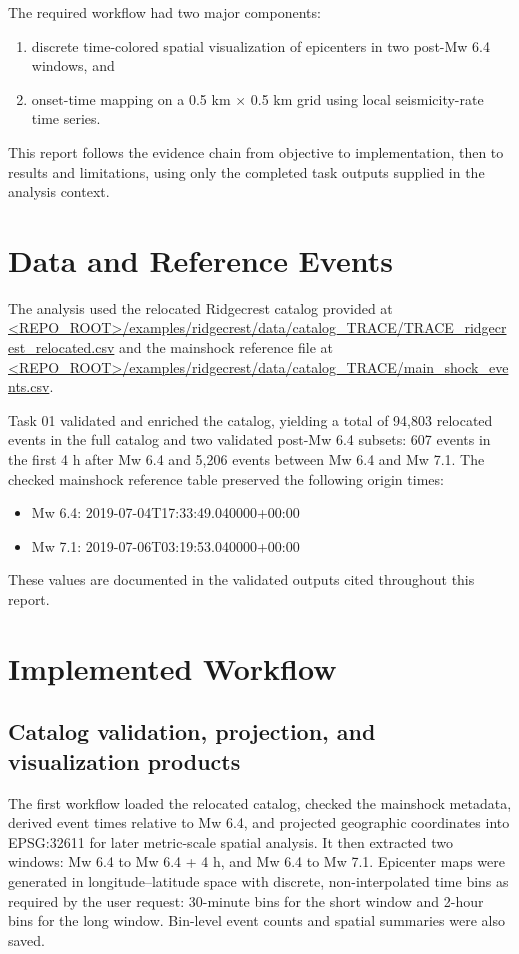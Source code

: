 \documentclass[11pt]{article}
\begin{document}
The required workflow had two major components:
\begin{enumerate}[leftmargin=1.5em]
    \item discrete time-colored spatial visualization of epicenters in two post-Mw 6.4 windows, and
    \item onset-time mapping on a 0.5 km $\times$ 0.5 km grid using local seismicity-rate time series.
\end{enumerate}

This report follows the evidence chain from objective to implementation, then to results and limitations, using only the completed task outputs supplied in the analysis context.

\section{Data and Reference Events}
The analysis used the relocated Ridgecrest catalog provided at
\url{<REPO_ROOT>/examples/ridgecrest/data/catalog_TRACE/TRACE_ridgecrest_relocated.csv}
and the mainshock reference file at
\url{<REPO_ROOT>/examples/ridgecrest/data/catalog_TRACE/main_shock_events.csv}.

Task 01 validated and enriched the catalog, yielding a total of 94,803 relocated events in the full catalog and two validated post-Mw 6.4 subsets: 607 events in the first 4 h after Mw 6.4 and 5,206 events between Mw 6.4 and Mw 7.1. The checked mainshock reference table preserved the following origin times:
\begin{itemize}[leftmargin=1.5em]
    \item Mw 6.4: 2019-07-04T17:33:49.040000+00:00
    \item Mw 7.1: 2019-07-06T03:19:53.040000+00:00
\end{itemize}
These values are documented in the validated outputs cited throughout this report.

\section{Implemented Workflow}
\subsection{Catalog validation, projection, and visualization products}
The first workflow loaded the relocated catalog, checked the mainshock metadata, derived event times relative to Mw 6.4, and projected geographic coordinates into EPSG:32611 for later metric-scale spatial analysis. It then extracted two windows: Mw 6.4 to Mw 6.4 + 4 h, and Mw 6.4 to Mw 7.1. Epicenter maps were generated in longitude--latitude space with discrete, non-interpolated time bins as required by the user request: 30-minute bins for the short window and 2-hour bins for the long window. Bin-level event counts and spatial summaries were also saved.
\end{document}
